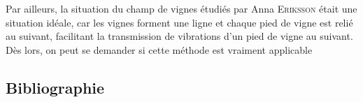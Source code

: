 Par ailleurs, la situation du champ de vignes étudiés par Anna
\textsc{Eriksson} était une situation idéale, car les vignes forment une
ligne et chaque pied de vigne est relié au suivant, facilitant la
transmission de vibrations d'un pied de vigne au suivant. Dès lors, on
peut se demander si cette méthode est vraiment applicable


\subsection{Bibliographie}
